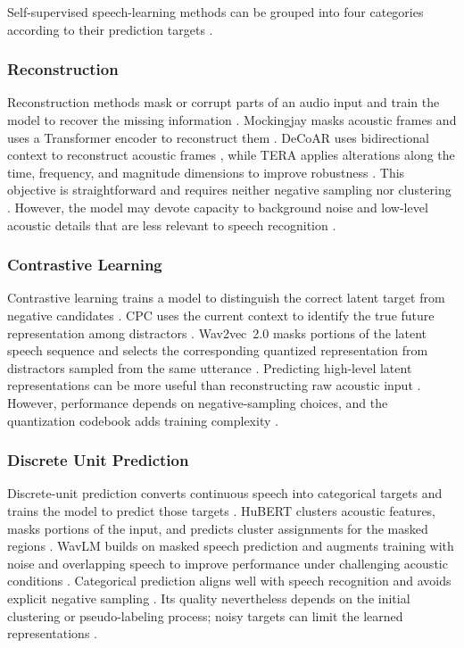 \documentclass[conference]{IEEEtran}
\begin{document}
Self-supervised speech-learning methods can be grouped into four categories according to their prediction targets \cite{liu2021tera,baevski2020wav2vec2,hsu2021hubert,chen2022wavlm,baevski2022data2vec}.

\subsubsection{Reconstruction}

Reconstruction methods mask or corrupt parts of an audio input and train the model to recover the missing information \cite{liu2020mockingjay,liu2021tera,ling2020decoar}. Mockingjay masks acoustic frames and uses a Transformer encoder to reconstruct them \cite{liu2020mockingjay}. DeCoAR uses bidirectional context to reconstruct acoustic frames \cite{ling2020decoar}, while TERA applies alterations along the time, frequency, and magnitude dimensions to improve robustness \cite{liu2021tera}. This objective is straightforward and requires neither negative sampling nor clustering \cite{liu2020mockingjay,liu2021tera}. However, the model may devote capacity to background noise and low-level acoustic details that are less relevant to speech recognition \cite{liu2021tera,ling2020decoar}.

\subsubsection{Contrastive Learning}

Contrastive learning trains a model to distinguish the correct latent target from negative candidates \cite{oord2018cpc,baevski2020wav2vec2}. CPC uses the current context to identify the true future representation among distractors \cite{oord2018cpc}. Wav2vec~2.0 masks portions of the latent speech sequence and selects the corresponding quantized representation from distractors sampled from the same utterance \cite{baevski2020wav2vec2}. Predicting high-level latent representations can be more useful than reconstructing raw acoustic input \cite{oord2018cpc,baevski2020wav2vec2}. However, performance depends on negative-sampling choices, and the quantization codebook adds training complexity \cite{baevski2020wav2vec2}.

\subsubsection{Discrete Unit Prediction}

Discrete-unit prediction converts continuous speech into categorical targets and trains the model to predict those targets \cite{hsu2021hubert,chen2022wavlm}. HuBERT clusters acoustic features, masks portions of the input, and predicts cluster assignments for the masked regions \cite{hsu2021hubert}. WavLM builds on masked speech prediction and augments training with noise and overlapping speech to improve performance under challenging acoustic conditions \cite{chen2022wavlm}. Categorical prediction aligns well with speech recognition and avoids explicit negative sampling \cite{hsu2021hubert,chen2022wavlm}. Its quality nevertheless depends on the initial clustering or pseudo-labeling process; noisy targets can limit the learned representations \cite{hsu2021hubert,chen2022wavlm}.
\end{document}
